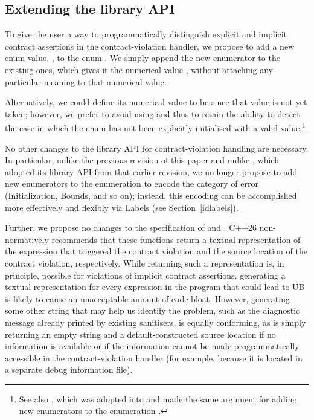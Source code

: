 \subsection{Extending the library API}
\label{library}

To give the user a way to programmatically distinguish explicit and implicit contract assertions in the contract-violation handler, we propose to add a new enum value, , to the enum \mbox{}. We simply append the new enumerator to the existing ones, which gives it the numerical value , without attaching any particular meaning to that numerical value.

Alternatively, we could define its numerical value to be  since that value is not yet taken; however, we prefer to avoid using  and thus to retain the ability to detect the case in which the enum has not been explicitly initialised with a valid value.\footnote{See also \cite{P3227R0}, which was adopted into \cite{P2900R14} and made the same argument for adding new enumerators to the enumeration .}

No other changes to the library API for contract-violation handling are necessary. In particular, unlike the previous revision of this paper and unlike \cite{P3081R1}, which adopted its library API from that earlier revision, we no longer propose to add new enumerators to the enumeration \mbox{} to encode the category of error (Initialization, Bounds, and so on); instead, this encoding can be accomplished more effectively and flexibly via Labels (see Section~\ref{idlabels}).

Further, we propose no changes to the specification of  and . C++26 non-normatively recommends that these functions return a textual representation of the expression that triggered the contract violation and the source location of the contract violation, respectively. While returning such a representation is, in principle, possible for violations of implicit contract assertions, generating a textual representation for every expression in the program that could lead to UB is likely to cause an unacceptable amount of code bloat. However, generating some other string that may help us identify the problem, such as the diagnostic message already printed by existing sanitisers, is equally conforming, as is simply returning an empty string and a default-constructed source location if no information is available or if the information cannot be made programmatically accessible in the contract-violation handler (for example,
because it is located in a separate debug information file). 

